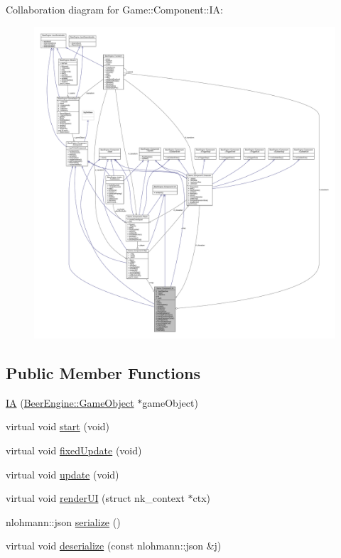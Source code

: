 Collaboration diagram for Game\+:\+:Component\+:\+:IA\+:\nopagebreak
\begin{figure}[H]
\begin{center}
\leavevmode
\includegraphics[width=350pt]{class_game_1_1_component_1_1_i_a__coll__graph}
\end{center}
\end{figure}
\subsection*{Public Member Functions}
\begin{DoxyCompactItemize}
\item 
\mbox{\hyperlink{class_game_1_1_component_1_1_i_a_a0193b2ba07bc5bcabe9278a6dcd592bc}{IA}} (\mbox{\hyperlink{class_beer_engine_1_1_game_object}{Beer\+Engine\+::\+Game\+Object}} $\ast$game\+Object)
\item 
virtual void \mbox{\hyperlink{class_game_1_1_component_1_1_i_a_ab440dc76a8837e291f6545e0dd15c819}{start}} (void)
\item 
virtual void \mbox{\hyperlink{class_game_1_1_component_1_1_i_a_a72b1e3aaf4686e0abef2e147d48f50e9}{fixed\+Update}} (void)
\item 
virtual void \mbox{\hyperlink{class_game_1_1_component_1_1_i_a_a5890e0da2fb55d58868c0cd441c33dc4}{update}} (void)
\item 
virtual void \mbox{\hyperlink{class_game_1_1_component_1_1_i_a_a50991daa660054341c1f339611226c02}{render\+UI}} (struct nk\+\_\+context $\ast$ctx)
\item 
nlohmann\+::json \mbox{\hyperlink{class_game_1_1_component_1_1_i_a_a3d5af6c25e457a246fac8cbd63764223}{serialize}} ()
\item 
virtual void \mbox{\hyperlink{class_game_1_1_component_1_1_i_a_a81f34676232065d85961d84be1268e6f}{deserialize}} (const nlohmann\+::json \&j)
\end{DoxyCompactItemize}
